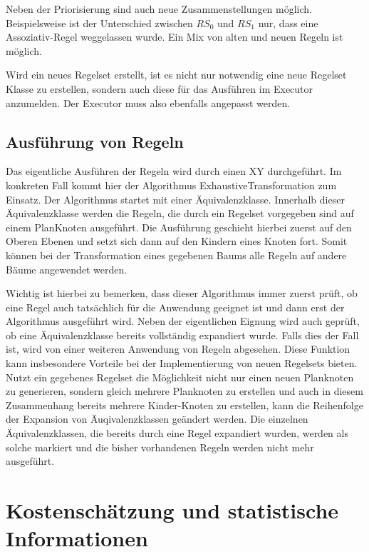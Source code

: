 Neben der Priorisierung sind auch neue Zusammenstellungen möglich. Beispielsweise ist der Unterschied zwischen $RS_0$ und $RS_1$ nur, dass eine Assoziativ-Regel weggelassen wurde. Ein Mix von alten und neuen Regeln ist möglich.

Wird ein neues Regelset erstellt, ist es nicht nur notwendig eine neue Regelset Klasse zu erstellen, sondern auch diese für das Ausführen im Executor anzumelden. Der Executor muss also ebenfalls angepasst werden.



\subsection{Ausführung von Regeln}

Das eigentliche Ausführen der Regeln wird durch einen XY durchgeführt. Im konkreten Fall kommt hier der Algorithmus ExhaustiveTransformation zum Einsatz. Der Algorithmus startet mit einer Äquivalenzklasse. Innerhalb dieser Äquivalenzklasse werden die Regeln, die durch ein Regelset vorgegeben sind auf einem PlanKnoten ausgeführt. Die Ausführung geschieht hierbei zuerst auf den Oberen Ebenen und setzt sich dann auf den Kindern eines Knoten fort. Somit können bei der Transformation eines gegebenen Baums alle Regeln auf andere Bäume angewendet werden.

Wichtig ist hierbei zu bemerken, dass dieser Algorithmus immer zuerst prüft, ob eine Regel auch tatsächlich für die Anwendung geeignet ist und dann erst der Algorithmus ausgeführt wird. Neben der eigentlichen Eignung wird auch geprüft, ob eine Äquivalenzklasse bereits vollständig expandiert wurde. Falls dies der Fall ist, wird von einer weiteren Anwendung von Regeln abgesehen. Diese Funktion kann insbesondere Vorteile bei der Implementierung von neuen Regelsets bieten. Nutzt ein gegebenes Regelset die Möglichkeit nicht nur einen neuen Planknoten zu generieren, sondern gleich mehrere Planknoten zu erstellen und auch in diesem Zusammenhang bereits mehrere Kinder-Knoten zu erstellen, kann die Reihenfolge der Expansion von Äuqivalenzklassen geändert werden. Die einzelnen Äquivalenzklassen, die bereits durch eine Regel expandiert wurden, werden als solche markiert und die bisher vorhandenen Regeln werden nicht mehr ausgeführt.


\section{Kostenschätzung und statistische Informationen}



